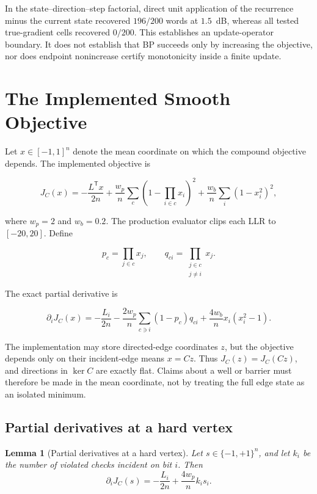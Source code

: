 \documentclass[11pt]{article}
\newtheorem{lemma}{Lemma}
\theoremstyle{remark}
\newcommand{\trans}{\mathsf{T}}
\begin{document}
In the state--direction--step factorial, direct unit application of the
recurrence minus the current state recovered $196/200$ words at $1.5$~dB,
whereas all tested true-gradient cells recovered $0/200$.  This establishes an
update-operator boundary.  It does not establish that BP succeeds only by
increasing the objective, nor does endpoint nonincrease certify monotonicity
inside a finite update.

\section{The Implemented Smooth Objective}

Let $x\in[-1,1]^n$ denote the mean coordinate on which the compound objective
depends.  The implemented objective is

\begin{equation}
J_C(x)=
-\frac{L^{\trans}x}{2n}
+\frac{w_p}{n}\sum_c
  \left(1-\prod_{i\in c}x_i\right)^2
+\frac{w_b}{n}\sum_i(1-x_i^2)^2,
\label{eq:jc}
\end{equation}

where $w_p=2$ and $w_b=0.2$.  The production evaluator clips each LLR to
$[-20,20]$.  Define

\begin{equation}
p_c=\prod_{j\in c}x_j,
\qquad
q_{ci}=\prod_{\substack{j\in c\\j\ne i}}x_j.
\end{equation}

The exact partial derivative is

\begin{equation}
\partial_iJ_C(x)
=-\frac{L_i}{2n}
-\frac{2w_p}{n}\sum_{c\ni i}(1-p_c)q_{ci}
+\frac{4w_b}{n}x_i(x_i^2-1).
\label{eq:partial}
\end{equation}

The implementation may store directed-edge coordinates $z$, but the objective
depends only on their incident-edge means $x=Cz$.  Thus $J_C(z)=J_C(Cz)$, and
directions in $\ker C$ are exactly flat.  Claims about a well or barrier must
therefore be made in the mean coordinate, not by treating the full edge state
as an isolated minimum.

\subsection{Partial derivatives at a hard vertex}

\begin{lemma}[Partial derivatives at a hard vertex]
Let $s\in\{-1,+1\}^n$, and let $k_i$ be the number of violated checks incident
on bit $i$.  Then
\begin{equation}
\partial_iJ_C(s)
=-\frac{L_i}{2n}+\frac{4w_p}{n}k_i s_i.
\label{eq:vertex-force}
\end{equation}
\end{lemma}
\end{document}
